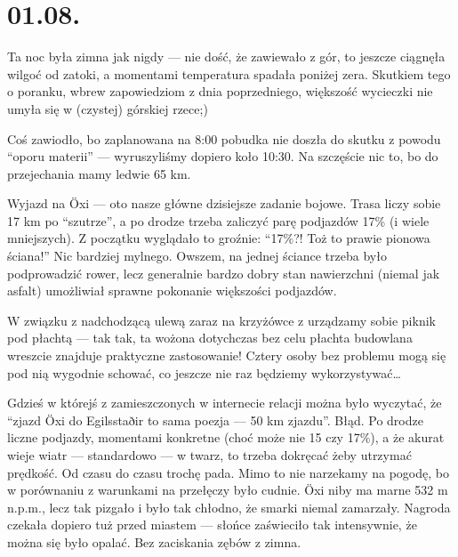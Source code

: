 \chapter*{01.08.}

Ta noc była zimna jak nigdy --- nie dość, że zawiewało z gór, to jeszcze ciągnęła wilgoć od zatoki, a momentami temperatura spadała poniżej zera. Skutkiem tego o poranku, wbrew zapowiedziom z dnia poprzedniego, większość wycieczki nie umyła się w (czystej) górskiej rzece;)


Coś zawiodło, bo zaplanowana na 8:00 pobudka nie doszła do skutku z powodu “oporu materii” --- wyruszyliśmy dopiero koło 10:30. Na szczęście nic to, bo do przejechania mamy ledwie 65 km.

Wyjazd na Öxi --- oto nasze główne dzisiejsze zadanie bojowe. Trasa liczy sobie 17 km po “szutrze”, a po drodze trzeba zaliczyć parę podjazdów 17\% (i wiele mniejszych). Z początku wyglądało to groźnie: “17\%?! Toż to prawie pionowa ściana!” Nic bardziej mylnego. Owszem, na jednej ściance trzeba było podprowadzić rower, lecz generalnie bardzo dobry stan nawierzchni (niemal jak asfalt) umożliwiał sprawne pokonanie większości podjazdów.


W związku z nadchodzącą ulewą zaraz na krzyżówce z  urządzamy sobie piknik pod płachtą --- tak tak, ta wożona dotychczas bez celu płachta budowlana wreszcie znajduje praktyczne zastosowanie! Cztery osoby bez problemu mogą się pod nią wygodnie schować, co jeszcze nie raz będziemy wykorzystywać…

Gdzieś w którejś z zamieszczonych w internecie relacji można było wyczytać, że “zjazd Öxi do Egilsstaðir to sama poezja --- 50 km zjazdu”. Błąd. Po drodze liczne podjazdy, momentami konkretne (choć może nie 15 czy 17\%), a że akurat wieje wiatr --- standardowo --- w twarz, to trzeba dokręcać żeby utrzymać prędkość. Od czasu do czasu trochę pada. Mimo to nie narzekamy na pogodę, bo w porównaniu z warunkami na przełęczy było cudnie. Öxi niby ma marne 532 m n.p.m., lecz tak pizgało i było tak chłodno, że smarki niemal zamarzały. Nagroda czekała dopiero tuż przed miastem --- słońce zaświeciło tak intensywnie, że można się było opalać. Bez zaciskania zębów z zimna.

